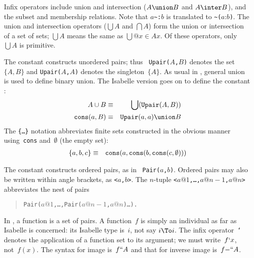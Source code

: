 Infix operators include union and intersection ($A\union B$ and $A\inter
B$), and the subset and membership relations.  Note that $a$\verb|~:|$b$ is
translated to \verb|~(|$a$:$b$\verb|)|.  The union and intersection
operators ($\bigcup A$ and $\bigcap A$) form the union or intersection of a
set of sets; $\bigcup A$ means the same as $\bigcup@{x\in A}x$.  Of these
operators, only $\bigcup A$ is primitive.

The constant  constructs unordered pairs; thus {\tt
Upair($A$,$B$)} denotes the set~$\{A,B\}$ and {\tt Upair($A$,$A$)} denotes
the singleton~$\{A\}$.  As usual in {\ZF}, general union is used to define
binary union.  The Isabelle version goes on to define the constant
:
\begin{eqnarray*}
   A\cup B              & \equiv &       \bigcup({\tt Upair}(A,B)) \\
   {\tt cons}(a,B)      & \equiv &        {\tt Upair}(a,a) \union B
\end{eqnarray*}
The {\tt\{\ldots\}} notation abbreviates finite sets constructed in the
obvious manner using~{\tt cons} and~$\emptyset$ (the empty set):
\begin{eqnarray*}
 \{a,b,c\} & \equiv & {\tt cons}(a,{\tt cons}(b,{\tt cons}(c,\emptyset)))
\end{eqnarray*}

The constant  constructs ordered pairs, as in {\tt
Pair($a$,$b$)}.  Ordered pairs may also be written within angle brackets,
as {\tt<$a$,$b$>}.  The $n$-tuple {\tt<$a@1$,\ldots,$a@{n-1}$,$a@n$>}
abbreviates the nest of pairs 
\begin{quote}
  \tt Pair($a@1$,\ldots,Pair($a@{n-1}$,$a@n$)\ldots).
\end{quote}

In {\ZF}, a function is a set of pairs.  A {\ZF} function~$f$ is simply an
individual as far as Isabelle is concerned: its Isabelle type is~$i$, not
say $i\To i$.  The infix operator~{\tt`} denotes the application of a
function set to its argument; we must write~$f{\tt`}x$, not~$f(x)$.  The
syntax for image is~$f{\tt``}A$ and that for inverse image is~$f{\tt-``}A$.


